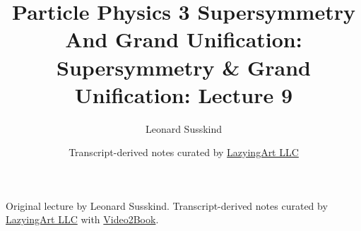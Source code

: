\documentclass[11pt,oneside]{book}
\begin{document}
\frontmatter
\title{Particle Physics 3 Supersymmetry And Grand Unification: Supersymmetry \& Grand Unification: Lecture 9}
\author{Leonard Susskind}
\date{Transcript-derived notes curated by \href{https://lazying.art}{LazyingArt LLC}}
\maketitle
\begin{center}
\small Original lecture by Leonard Susskind. Transcript-derived notes curated by \href{https://lazying.art}{LazyingArt LLC} with \href{https://github.com/lachlanchen/Video2Book}{Video2Book}.
\end{center}
\clearpage
\mainmatter

\end{document}
